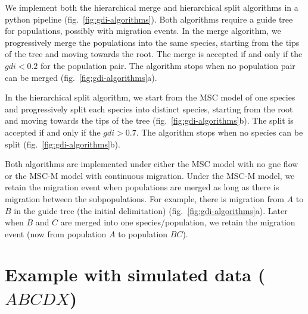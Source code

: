 \documentclass{article1}
\begin{document}
We implement both the hierarchical merge and hierarchical split algorithms in a python
pipeline (fig.~\ref{fig:gdi-algorithms}).  Both algorithms require a guide tree for
populations, possibly with migration events.  In the merge algorithm, we progressively
merge the populations into the same species, starting from the tips of the tree and moving
towards the root.  The merge is accepted if and only if the $gdi < 0.2$ for the
population pair.  The algorithm stops when no population pair can be merged
(fig.~\ref{fig:gdi-algorithms}a).

In the hierarchical split algorithm, we start from the MSC model of one species and
progressively split each species into distinct species, starting from the root and moving
towards the tips of the tree (fig.~\ref{fig:gdi-algorithms}b).  The split is accepted if
and only if the $gdi > 0.7$.  The algorithm stops when no species can be split
(fig.~\ref{fig:gdi-algorithms}b).

Both algorithms are implemented under either the MSC model with no gne flow or the MSC-M
model with continuous migration.  Under the MSC-M model, we retain the migration event
when populations are merged as long as there is migration between the subpopulations.  For
example, there is migration from $A$ to $B$ in the guide tree (the initial delimitation)
(fig.~\ref{fig:gdi-algorithms}a).  Later when $B$ and $C$ are merged into one
species/population, we retain the migration event (now from population $A$ to population
$BC$).


\section{Example with simulated data ($ABCDX$)}
\end{document}
